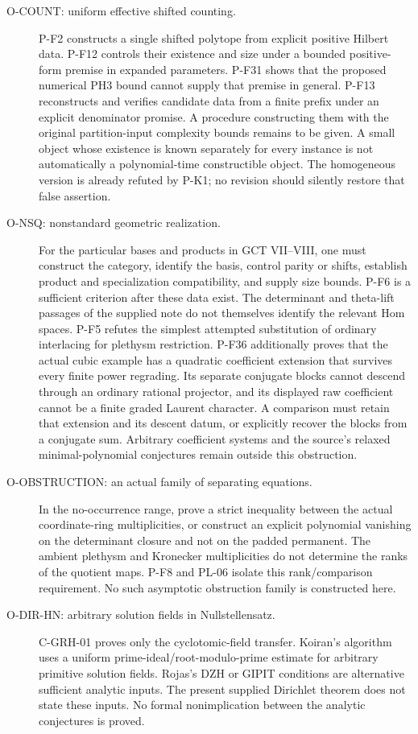 \documentclass[11pt,a4paper]{article}
\begin{document}
\begin{description}
\item[O-COUNT: uniform effective shifted counting.]
P-F2 constructs a single shifted polytope from explicit positive Hilbert
data. P-F12 controls their existence and size under a bounded
positive-form premise in expanded parameters. P-F31 shows that the
proposed numerical PH3 bound cannot supply that premise in general. P-F13 reconstructs
and verifies candidate data from a finite prefix under an explicit
denominator promise. A procedure constructing them with the original
partition-input complexity bounds remains to be given. A small object
whose existence is known separately for every instance is not automatically
a polynomial-time constructible object. The homogeneous version is already
refuted by P-K1; no revision should silently restore that false assertion.

\item[O-NSQ: nonstandard geometric realization.]
For the particular bases and products in GCT VII--VIII, one must construct
the category, identify the basis, control parity or shifts, establish
product and specialization compatibility, and supply size bounds.
P-F6 is a sufficient criterion after these data exist. The determinant
and theta-lift passages of the supplied note do not themselves identify
the relevant Hom spaces. P-F5 refutes the simplest attempted substitution
of ordinary interlacing for plethysm restriction.
P-F36 additionally proves that the actual cubic example has a
quadratic coefficient extension that survives every finite power
regrading. Its separate conjugate blocks cannot descend through
an ordinary rational projector, and its displayed raw coefficient
cannot be a finite graded Laurent character. A comparison must
retain that extension and its descent datum, or explicitly recover
the blocks from a conjugate sum. Arbitrary coefficient systems
and the source's relaxed minimal-polynomial conjectures remain
outside this obstruction.

\item[O-OBSTRUCTION: an actual family of separating equations.]
In the no-occurrence range, prove a strict inequality between the actual
coordinate-ring multiplicities, or construct an explicit polynomial
vanishing on the determinant closure and not on the padded permanent.
The ambient plethysm and Kronecker multiplicities do not determine the
ranks of the quotient maps. P-F8 and PL-06 isolate this rank/comparison
requirement. No such asymptotic obstruction family is constructed here.

\item[O-DIR-HN: arbitrary solution fields in Nullstellensatz.]
C-GRH-01 proves only the cyclotomic-field transfer. Koiran's algorithm uses
a uniform prime-ideal/root-modulo-prime estimate for arbitrary primitive
solution fields. Rojas's DZH or GIPIT conditions are alternative sufficient
analytic inputs. The present supplied Dirichlet theorem does not state
these inputs. No formal nonimplication between the analytic conjectures
is proved.


\end{description}
\end{document}

